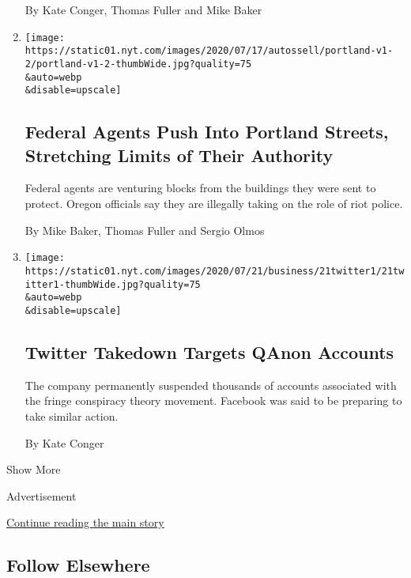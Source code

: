 \begin{enumerate}
  By Kate Conger, Thomas Fuller and Mike Baker
\item
  \href{/2020/07/25/us/portland-federal-legal-jurisdiction-courts.html}{}

  \texttt{[image: https://static01.nyt.com/images/2020/07/17/autossell/portland-v1-2/portland-v1-2-thumbWide.jpg?quality=75\\\&auto=webp\\\&disable=upscale]}

  \hypertarget{federal-agents-push-into-portland-streets-stretching-limits-of-their-authority}{%
  \subsection{Federal Agents Push Into Portland Streets, Stretching
  Limits of Their
  Authority}\label{federal-agents-push-into-portland-streets-stretching-limits-of-their-authority}}

  Federal agents are venturing blocks from the buildings they were sent
  to protect. Oregon officials say they are illegally taking on the role
  of riot police.

  By Mike Baker, Thomas Fuller and Sergio Olmos
\item
  \href{/2020/07/21/technology/twitter-bans-qanon-accounts.html}{}

  \texttt{[image: https://static01.nyt.com/images/2020/07/21/business/21twitter1/21twitter1-thumbWide.jpg?quality=75\\\&auto=webp\\\&disable=upscale]}

  \hypertarget{twitter-takedown-targets-qanon-accounts}{%
  \subsection{Twitter Takedown Targets QAnon
  Accounts}\label{twitter-takedown-targets-qanon-accounts}}

  The company permanently suspended thousands of accounts associated
  with the fringe conspiracy theory movement. Facebook was said to be
  preparing to take similar action.

  By Kate Conger
\end{enumerate}

Show More

Advertisement

\protect\hyperlink{after-mid2}{Continue reading the main story}

\hypertarget{follow-elsewhere}{%
\subsection{Follow Elsewhere}\label{follow-elsewhere}}


